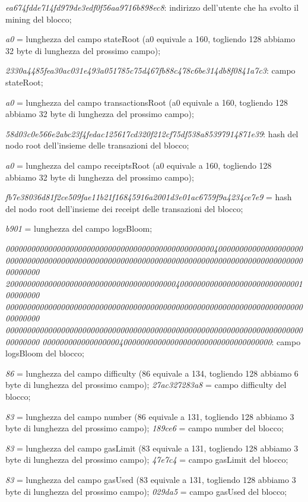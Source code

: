 \documentclass[12pt]{report}
\begin{document}
\textit{ea674fdde714fd979de3edf0f56aa9716b898ec8}: indirizzo dell'utente che ha svolto il mining del blocco;

\textit{a0} = lunghezza del campo stateRoot (a0 equivale a 160, togliendo 128 abbiamo 32 byte di lunghezza del prossimo campo);

\textit{2330a4485fea30ac031e493a051785c75d467fb88c478c6be314db8f0841a7c3}: campo stateRoot;

\textit{a0} = lunghezza del campo transactionsRoot (a0 equivale a 160, togliendo 128 abbiamo 32 byte di lunghezza del prossimo campo);

\textit{58d03c0e566e2abc23f4fedac125617cd320f212cf75df538a85397914871e39}: hash del nodo root dell'insieme delle transazioni del blocco;

\textit{a0} = lunghezza del campo receiptsRoot (a0 equivale a 160, togliendo 128 abbiamo 32 byte di lunghezza del prossimo campo);

\textit{fb7e38036d81f2ce509fae11b21f16845916a2001d3e01ac6759f9a4234ce7e9} = hash del nodo root dell'insieme dei receipt delle transazioni del blocco;

\textit{b901} = lunghezza del campo logsBloom;

\textit{0000000000000000000000000000000000000000000000000400000000000000000000
000000000000000000000000000000000000000000000000000000000000000000000000000000
200000000000000000000000000000000000000040000000000000000000000000000100000000
000000000000000000000000000000000000000000000000000000000000000000000000000000
000000000000000000000000000000000000000000000000000000000000000000000000000000
000000000000000000400000000000000000000000000000000000}: campo logsBloom del blocco;

\textit{86} = lunghezza del campo difficulty (86 equivale a 134, togliendo 128 abbiamo 6 byte di lunghezza del prossimo campo);
\textit{27ac327283a8} = campo difficulty del blocco;

\textit{83} = lunghezza del campo number (86 equivale a 131, togliendo 128 abbiamo 3 byte di lunghezza del prossimo campo);
\textit{189ce6} = campo number del blocco;

\textit{83} = lunghezza del campo gasLimit (83 equivale a 131, togliendo 128 abbiamo 3 byte di lunghezza del prossimo campo);
\textit{47e7c4} = campo gasLimit del blocco;

\textit{83} = lunghezza del campo gasUsed (83 equivale a 131, togliendo 128 abbiamo 3 byte di lunghezza del prossimo campo);
\textit{029da5} = campo gasUsed del blocco;
\end{document}
